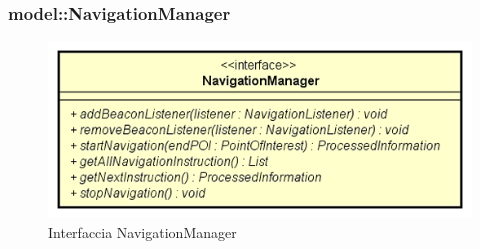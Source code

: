 \documentclass[../DefinizioneDiProdotto.tex]{subfiles}
\begin{document}
\subsubsection{model::NavigationManager}

    \begin{figure}[H]
        \centering
        \includegraphics{img/NavigationManager.png}
        \caption{Interfaccia NavigationManager}\label{fig:model::NavigationManager} 
    \end{figure}
\end{document}
